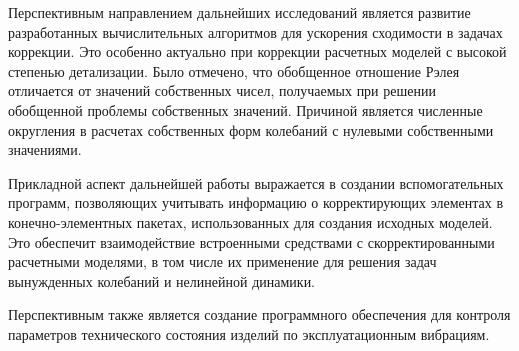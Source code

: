 Перспективным направлением дальнейших исследований является развитие разработанных вычислительных алгоритмов для ускорения сходимости в задачах коррекции. Это особенно актуально при коррекции расчетных моделей с высокой степенью детализации. Было отмечено, что обобщенное отношение Рэлея отличается от значений собственных чисел, получаемых при решении обобщенной проблемы собственных значений. Причиной является численные округления в расчетах собственных форм колебаний с нулевыми собственными значениями.

Прикладной аспект дальнейшей работы выражается в создании вспомогательных программ, позволяющих учитывать информацию о корректирующих элементах в конечно-элементных пакетах, использованных для создания исходных моделей. Это обеспечит взаимодействие встроенными средствами с скорректированными расчетными моделями, в том числе их применение для решения задач вынужденных колебаний и нелинейной динамики.

Перспективным также является создание программного обеспечения для контроля параметров технического состояния изделий по эксплуатационным вибрациям.